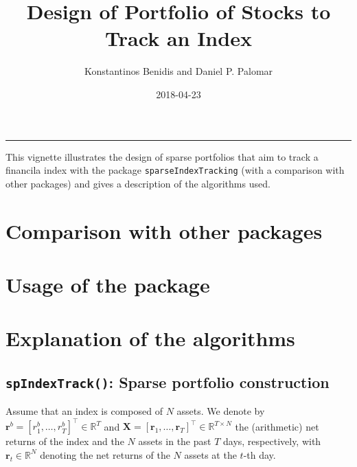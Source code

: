 \documentclass[]{article}
\title{Design of Portfolio of Stocks to Track an Index}
\author{Konstantinos Benidis and Daniel P. Palomar}
\date{2018-04-23}
\begin{document}
\maketitle

{
\setcounter{tocdepth}{2}
\tableofcontents
}
\begin{center}\rule{0.5\linewidth}{\linethickness}\end{center}

This vignette illustrates the design of sparse portfolios that aim to
track a financila index with the package \texttt{sparseIndexTracking}
(with a comparison with other packages) and gives a description of the
algorithms used.

\section{Comparison with other
packages}\label{comparison-with-other-packages}

\section{Usage of the package}\label{usage-of-the-package}

\section{Explanation of the
algorithms}\label{explanation-of-the-algorithms}

\subsection{\texorpdfstring{\texttt{spIndexTrack()}: Sparse portfolio
construction}{spIndexTrack(): Sparse portfolio construction}}\label{spindextrack-sparse-portfolio-construction}

Assume that an index is composed of \(N\) assets. We denote by
\(\mathbf{r}^b=[r_1^b,\dots,r_T^b]^\top\in\mathbb{R}^T\) and
\(\mathbf{X}=[\mathbf{r}_1,\dots,\mathbf{r}_T]^\top\in\mathbb{R}^{T\times N}\)
the (arithmetic) net returns of the index and the \(N\) assets in the
past \(T\) days, respectively, with \(\mathbf{r}_t\in\mathbb{R}^N\)
denoting the net returns of the \(N\) assets at the \(t\)-th day.
\end{document}
